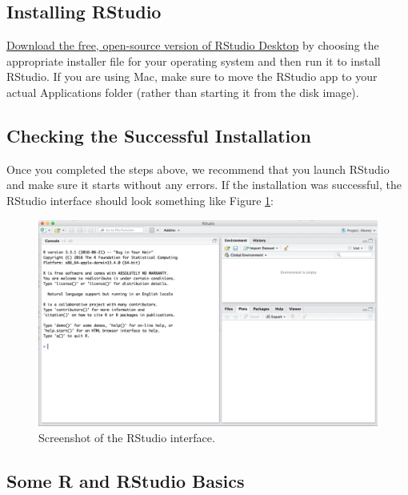 \documentclass[
]{book}
\begin{document}
\hypertarget{installing-rstudio}{%
\subsection{Installing RStudio}\label{installing-rstudio}}

\href{https://www.rstudio.com/products/rstudio/download/}{Download the free, open-source version of RStudio Desktop} by choosing the appropriate installer file for your operating system and then run it to install RStudio. If you are using Mac, make sure to move the RStudio app to your actual Applications folder (rather than starting it from the disk image).

\hypertarget{checking-the-successful-installation}{%
\subsection{Checking the Successful Installation}\label{checking-the-successful-installation}}

Once you completed the steps above, we recommend that you launch RStudio and make sure it starts without any errors. If the installation was successful, the RStudio interface should look something like Figure \ref{fig:interface}:

\begin{figure}
\includegraphics[width=1\linewidth]{images/rstudio_interface} \caption{Screenshot of the RStudio interface.}\label{fig:interface}
\end{figure}

\hypertarget{some-r-and-rstudio-basics}{%
\subsection{Some R and RStudio Basics}\label{some-r-and-rstudio-basics}}
\end{document}
